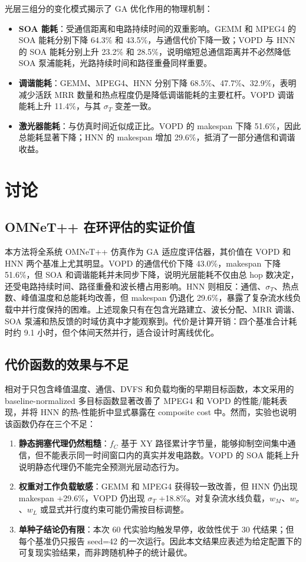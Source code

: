 \documentclass[conference]{IEEEtran}
\begin{document}
光层三组分的变化模式揭示了 GA 优化作用的物理机制：

\begin{itemize}
\item \textbf{SOA 能耗}：受通信距离和电路持续时间的双重影响。GEMM 和 MPEG4 的 SOA 能耗分别下降 64.3\% 和 43.5\%，与通信代价下降一致；VOPD 与 HNN 的 SOA 能耗分别上升 23.2\% 和 28.5\%，说明缩短总通信距离并不必然降低 SOA 泵浦能耗，光路持续时间和路径重叠同样重要。
\item \textbf{调谐能耗}：GEMM、MPEG4、HNN 分别下降 68.5\%、47.7\%、32.9\%，表明减少活跃 MRR 数量和热点程度仍是降低调谐能耗的主要杠杆。VOPD 调谐能耗上升 11.4\%，与其 $\sigma_T$ 变差一致。
\item \textbf{激光器能耗}：与仿真时间近似成正比。VOPD 的 makespan 下降 51.6\%，因此总能耗显著下降；HNN 的 makespan 增加 29.6\%，抵消了一部分通信和调谐收益。
\end{itemize}

\section{讨论}

\subsection{OMNeT++ 在环评估的实证价值}

本方法将全系统 OMNeT++ 仿真作为 GA 适应度评估器，其价值在 VOPD 和 HNN 两个基准上尤其明显。VOPD 的通信代价下降 43.0\%，makespan 下降 51.6\%，但 SOA 和调谐能耗并未同步下降，说明光层能耗不仅由总 hop 数决定，还受电路持续时间、路径重叠和波长槽占用影响。HNN 则相反：通信、$\sigma_T$、热点数、峰值温度和总能耗均改善，但 makespan 仍退化 29.6\%，暴露了复杂流水线负载中并行度保持的困难。上述现象只有在包含光路建立、波长分配、MRR 调谐、SOA 泵浦和热反馈的时域仿真中才能观察到。代价是计算开销：四个基准合计耗时约 9.1 小时，但个体间天然并行，适合设计时离线优化。

\subsection{代价函数的效果与不足}

相对于只包含峰值温度、通信、DVFS 和负载均衡的早期目标函数，本文采用的 baseline-normalized 多目标函数显著改善了 MPEG4 和 VOPD 的性能/能耗表现，并将 HNN 的热-性能折中显式暴露在 composite cost 中。然而，实验也说明该函数仍存在三个不足：

\begin{enumerate}
\item \textbf{静态拥塞代理仍然粗糙}：$f_C$ 基于 XY 路径累计字节量，能够抑制空间集中通信，但不能表示同一时间窗口内的真实并发电路数。VOPD 的 SOA 能耗上升说明静态代理仍不能完全预测光层动态行为。
\item \textbf{权重对工作负载敏感}：GEMM 和 MPEG4 获得较一致改善，但 HNN 仍出现 makespan +29.6\%，VOPD 仍出现 $\sigma_T$ +18.8\%。对复杂流水线负载，$w_M$、$w_\sigma$、$w_L$ 或显式并行度约束可能仍需按目标调整。
\item \textbf{单种子结论仍有限}：本次 60 代实验均触发早停，收敛性优于 30 代结果；但每个基准仍只报告 seed=42 的一次运行。因此本文结果应表述为给定配置下的可复现实验结果，而非跨随机种子的统计最优。
\end{enumerate}
\end{document}
